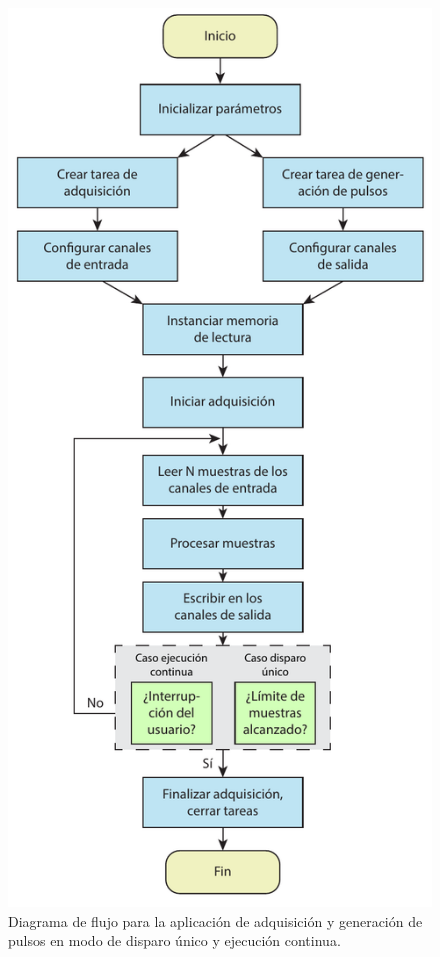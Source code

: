 \documentclass[a4paper,11pt]{article}
\begin{document}
	\begin{figure}[h!] 
        \centering
        \includegraphics[height=.95\textheight]{figs/flujo_software.pdf}
        \caption{Diagrama de flujo para la aplicación de adquisición y generación de pulsos en modo de disparo único y ejecución continua.}
        \label{fig:flujo_software}
 
    \end{figure}
\end{document}
